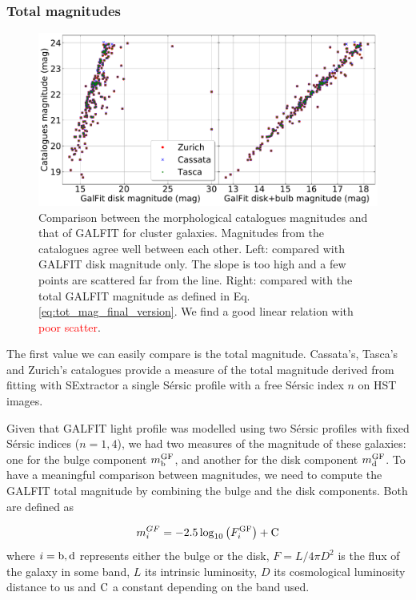 \subsubsection{Total magnitudes}

\begin{figure}[htbp]
	\includegraphics[width=\linewidth]{../Plots/catalogMag_against_GalfitMag_corrected.pdf}
	\caption[Comparison between magnitudes]{Comparison between the morphological catalogues magnitudes and that of GALFIT for cluster galaxies. Magnitudes from the catalogues agree well between each other. Left: compared with GALFIT disk magnitude only. The slope is too high and a few points are scattered far from the line. Right: compared with the total GALFIT magnitude as defined in Eq.\,\ref{eq:tot_mag_final_version}. We find a good linear relation with \textcolor{red}{poor scatter}.}
	\label{fig:comp_mags}
\end{figure}

The first value we can easily compare is the total magnitude. Cassata's, Tasca's and Zurich's catalogues provide a measure of the total magnitude derived from fitting with SExtractor a single Sérsic profile with a free Sérsic index $n$ on HST images.

Given that GALFIT light profile was modelled using two Sérsic profiles with fixed Sérsic indices ($n = 1, 4$), we had two measures of the magnitude of these galaxies: one for the bulge component $m_{\rm{b}}^{\rm{GF}}$, and another for the disk component $m_{\rm{d}}^{\rm{GF}}$. To have a meaningful comparison between magnitudes, we need to compute the GALFIT total magnitude by combining the bulge and the disk components. Both are defined as

\begin{equation}
	m_i^{GF} = -2.5 \log_{10} \left ( F_i^{\rm{GF}} \right ) + \rm{C}
	\label{eq:disk_bulge_lum}
\end{equation}
 where $i = \rm{b, d}$ represents either the bulge or the disk, $F = L/{4 \pi D^2}$ is the flux of the galaxy in some band, $L$ its intrinsic luminosity, $D$ its cosmological luminosity distance to us and $\rm{C}$ a constant depending on the band used.

